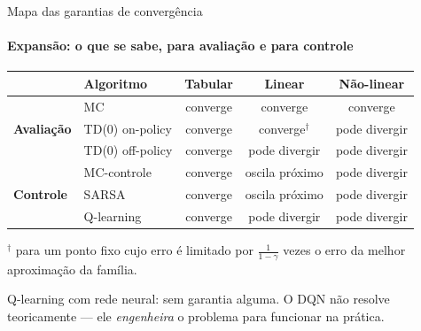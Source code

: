 \documentclass[aspectratio=169, 11pt]{beamer}
\begin{document}
\begin{frame}{Mapa das garantias de convergência}
  \framesubtitle{Expansão: o que se sabe, para avaliação e para controle}

  \begin{center}\small
  \begin{tabular}{llccc}
    \toprule
    & Algoritmo & Tabular & Linear & Não-linear \\
    \midrule
    \multirow{3}{*}{\textbf{Avaliação}}
      & MC              & converge & converge & converge \\
      & TD(0) on-policy & converge & converge$^{\dagger}$ & pode divergir \\
      & TD(0) off-policy& converge & pode divergir & pode divergir \\
    \midrule
    \multirow{3}{*}{\textbf{Controle}}
      & MC-controle     & converge & oscila próximo & pode divergir \\
      & SARSA           & converge & oscila próximo & pode divergir \\
      & Q-learning      & converge & pode divergir & pode divergir \\
    \bottomrule
  \end{tabular}
  \end{center}

  {\footnotesize $^{\dagger}$ para um ponto fixo cujo erro é limitado por
  $\frac{1}{1-\gamma}$ vezes o erro da melhor aproximação da família.}

  \vspace{-0.6em}
  \begin{ideiabox}
    Q-learning com rede neural: sem garantia alguma. O DQN não resolve
    teoricamente — ele \emph{engenheira} o problema para funcionar na
    prática.
  \end{ideiabox}
\end{frame}
\end{document}
